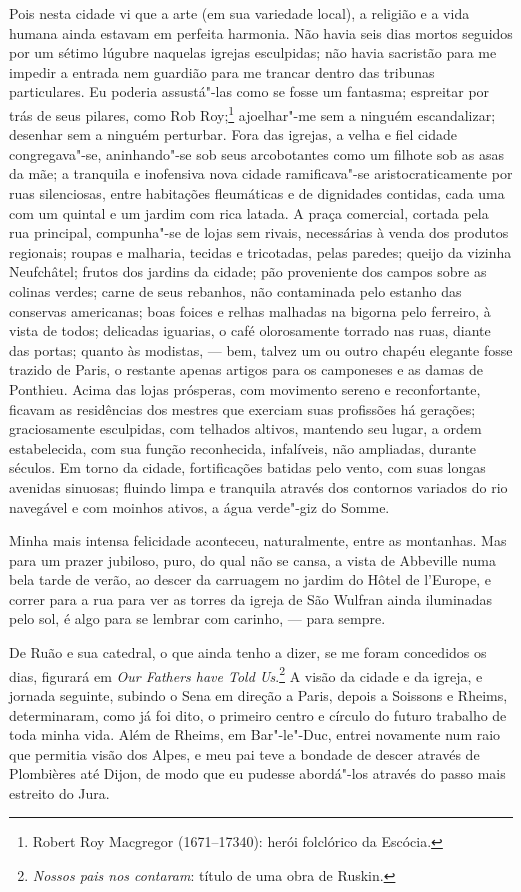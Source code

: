 Pois nesta cidade vi que a arte (em sua variedade local), a
religião e a vida humana ainda estavam em perfeita harmonia. Não havia
seis dias mortos seguidos por um sétimo lúgubre naquelas igrejas
esculpidas; não havia sacristão para me impedir a entrada nem guardião
para me trancar dentro das tribunas particulares. Eu poderia assustá"-las
como se fosse um fantasma; espreitar por trás de seus pilares, como Rob
Roy;\footnote{Robert Roy Macgregor (1671--17340): herói folclórico da
  Escócia.} ajoelhar"-me sem a ninguém escandalizar;
desenhar sem a ninguém perturbar. Fora das igrejas, a velha e fiel
cidade congregava"-se, aninhando"-se sob seus arcobotantes como um filhote
sob as asas da mãe; a tranquila e inofensiva nova cidade ramificava"-se
aristocraticamente por ruas silenciosas, entre habitações fleumáticas e
de dignidades contidas, cada uma com um quintal e um jardim com rica
latada. A praça comercial, cortada pela rua principal, compunha"-se de
lojas sem rivais, necessárias à venda dos produtos regionais; roupas e
malharia, tecidas e tricotadas, pelas paredes; queijo da vizinha
Neufchâtel; frutos dos jardins da cidade; pão proveniente dos campos
sobre as colinas verdes; carne de seus rebanhos, não contaminada pelo
estanho das conservas americanas; boas foices e relhas malhadas na
bigorna pelo ferreiro, à vista de todos; delicadas iguarias, o café
olorosamente torrado nas ruas, diante das portas; quanto às modistas, ---
bem, talvez um ou outro chapéu elegante fosse trazido de Paris, o
restante apenas artigos para os camponeses e as damas de Ponthieu. Acima
das lojas prósperas, com movimento sereno e reconfortante, ficavam as
residências dos mestres que exerciam suas profissões há gerações;
graciosamente esculpidas, com telhados altivos, mantendo seu lugar, a
ordem estabelecida, com sua função reconhecida, infalíveis, não
ampliadas, durante séculos. Em torno da cidade, fortificações batidas
pelo vento, com suas longas avenidas sinuosas; fluindo limpa e tranquila
através dos contornos variados do rio navegável e com moinhos ativos, a
água verde"-giz do Somme.

Minha mais intensa felicidade aconteceu, naturalmente, entre as
montanhas. Mas para um prazer jubiloso, puro, do qual não se cansa, a
vista de Abbeville numa bela tarde de verão, ao descer da carruagem no
jardim do Hôtel de l'Europe, e correr para a rua para ver as torres da
igreja de São Wulfran ainda iluminadas pelo sol, é algo para se lembrar
com carinho, --- para sempre.

De Ruão e sua catedral, o que ainda tenho a dizer, se me foram
concedidos os dias, figurará em \textit{Our Fathers have Told
Us}.\footnote{\textit{Nossos pais nos contaram}: título de uma obra de
  Ruskin.} A visão da cidade e da igreja, e jornada
seguinte, subindo o Sena em direção a Paris, depois a Soissons e Rheims,
determinaram, como já foi dito, o primeiro centro e círculo do futuro
trabalho de toda minha vida. Além de Rheims, em Bar"-le"-Duc, entrei
novamente num raio que permitia visão dos Alpes, e meu pai teve a
bondade de descer através de Plombières até Dijon, de modo que eu
pudesse abordá"-los através do passo mais estreito do Jura.

